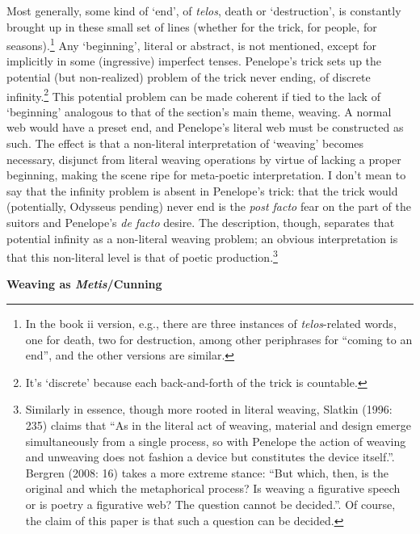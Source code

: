 \documentclass[12pt]{article}
\begin{document}
Most generally, some kind of `end', of \textit{telos}, death or `destruction', is constantly brought up in these small set of lines (whether for the trick, for people, for seasons).\footnote{ In the book ii version, e.g., there are three instances of \textit{telos}-related words, one for death, two for destruction, among other periphrases for ``coming to an end'', and the other versions are similar.} Any `beginning', literal or abstract, is not mentioned, except for implicitly in some (ingressive) imperfect tenses. Penelope's trick sets up the potential (but non-realized) problem of the trick never ending, of discrete infinity.\footnote{ It's `discrete' because each back-and-forth of the trick is countable.} This potential problem can be made coherent if tied to the lack of `beginning' analogous to that of the section's main theme, weaving. A normal web would have a preset end, and Penelope's literal web must be constructed as such. The effect is that a non-literal interpretation of `weaving' becomes necessary, disjunct from literal weaving operations by virtue of lacking a proper beginning, making the scene ripe for meta-poetic interpretation. I don't mean to say that the infinity problem is absent in Penelope's trick: that the trick would (potentially, Odysseus pending) never end is the \textit{post facto} fear on the part of the suitors and Penelope's \textit{de facto} desire. The description, though, separates that potential infinity as a non-literal weaving problem; an obvious interpretation is that this non-literal level is that of poetic production.\footnote{ Similarly in essence, though more rooted in literal weaving, Slatkin (1996: 235) claims that ``As in the literal act of weaving, material and design emerge simultaneously from a single process, so with Penelope the action of weaving and unweaving does not fashion a device but constitutes the device itself.''. Bergren (2008: 16) takes a more extreme stance: ``But which, then, is the original and which the metaphorical process? Is weaving a figurative speech or is poetry a figurative web? The question cannot be decided.''. Of course, the claim of this paper is that such a question can be decided.}

\noindent \hfill \par
\noindent \textbf{ Weaving as \textit{Metis}/Cunning}
\end{document}
